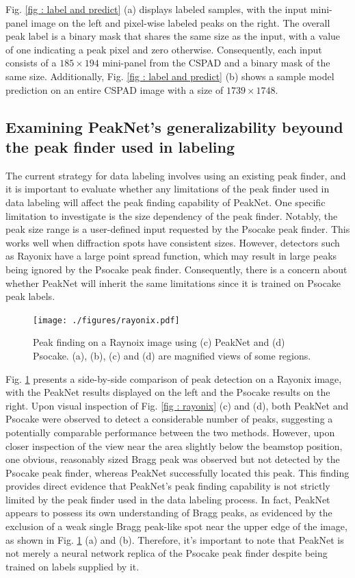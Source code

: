 \documentclass[conference]{IEEEtran}
\newcommand{\peaknet}{PeakNet}
\newcommand{\psocake}{Psocake}
\begin{document}
Fig. \ref{fig : label and predict} (a) displays labeled samples, with the input
mini-panel image on the left and pixel-wise labeled peaks on the right.  The
overall peak label is a binary mask that shares the same size as the input, with
a value of one indicating a peak pixel and zero otherwise.  Consequently, each
input consists of a $185 \times 194$ mini-panel from the CSPAD and a binary mask
of the same size.  Additionally, Fig.  \ref{fig : label and predict} (b) shows a
sample model prediction on an entire CSPAD image with a size of $1739 \times
1748$.  


\subsection{Examining \peaknet{}'s generalizability beyound the peak finder used
in labeling}

The current strategy for data labeling involves using an existing peak finder,
and it is important to evaluate whether any limitations of the peak finder used
in data labeling will affect the peak finding capability of \peaknet{}. One
specific limitation to investigate is the size dependency of the peak finder.
Notably, the peak size range is a user-defined input requested by the \psocake{}
peak finder. This works well when diffraction spots have consistent sizes.
However, detectors such as Rayonix have a large point spread function, which may
result in large peaks being ignored by the \psocake{} peak finder.  Consequently,
there is a concern about whether \peaknet{} will inherit the same limitations
since it is trained on \psocake{} peak labels.

\begin{figure}[htbp]
\centering
\texttt{[image: ./figures/rayonix.pdf]}
\caption{Peak finding on a Raynoix image using (c) \peaknet{} and (d) \psocake{}.  (a), (b), (c) and (d) are magnified views of some regions.}
\label{fig : rayonix}
\end{figure}

Fig. \ref{fig : rayonix} presents a side-by-side comparison of peak detection on
a Rayonix image, with the \peaknet{} results displayed on the left and the
\psocake{} results on the right. Upon visual inspection of Fig. \ref{fig :
rayonix} (c) and (d), both \peaknet{} and \psocake{} were observed to detect a
considerable number of peaks, suggesting a potentially comparable performance
between the two methods.  However, upon closer inspection of the view near the
area slightly below the beamstop position, one obvious, reasonably sized Bragg
peak was observed but not detected by the \psocake{} peak finder, whereas
\peaknet{} successfully located this peak.  This finding provides direct
evidence that \peaknet{}'s peak finding capability is not strictly limited by
the peak finder used in the data labeling process.  In fact, \peaknet{} appears
to possess its own understanding of Bragg peaks, as evidenced by the exclusion
of a weak single Bragg peak-like spot near the upper edge of the image, as shown
in Fig. \ref{fig : rayonix} (a) and (b).  Therefore, it's important to note that
\peaknet{} is not merely a neural network replica of the \psocake{} peak finder
despite being trained on labels supplied by it.
\end{document}
